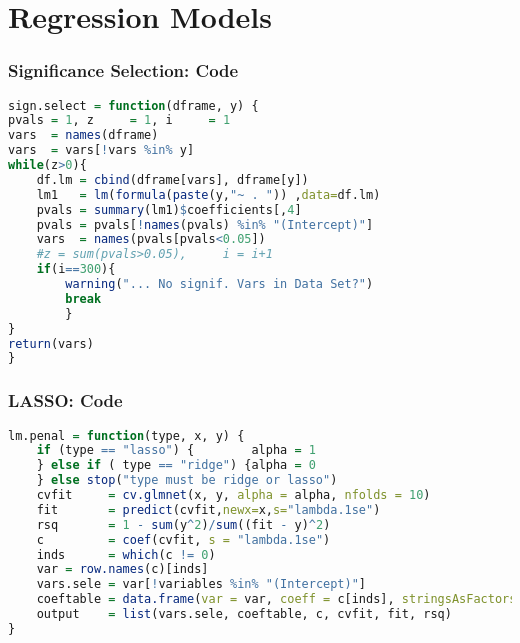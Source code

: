
\section{Regression Models}

\begin{frame}[fragile]
\frametitle{Significance Selection: Code}

\begin{lstlisting}[language=R]
sign.select = function(dframe, y) {
pvals = 1, z     = 1, i     = 1
vars  = names(dframe)
vars  = vars[!vars %in% y]
while(z>0){
    df.lm = cbind(dframe[vars], dframe[y])
    lm1   = lm(formula(paste(y,"~ . ")) ,data=df.lm)
    pvals = summary(lm1)$coefficients[,4]
    pvals = pvals[!names(pvals) %in% "(Intercept)"]
    vars  = names(pvals[pvals<0.05])
    #z = sum(pvals>0.05),     i = i+1
    if(i==300){
        warning("... No signif. Vars in Data Set?")
        break
        }
}
return(vars)
}

\end{lstlisting}

\end{frame}




\begin{frame}[fragile]
\frametitle{LASSO: Code}

\begin{lstlisting}[language=R]
lm.penal = function(type, x, y) {
    if (type == "lasso") {        alpha = 1
    } else if ( type == "ridge") {alpha = 0
    } else stop("type must be ridge or lasso")
    cvfit     = cv.glmnet(x, y, alpha = alpha, nfolds = 10)
    fit       = predict(cvfit,newx=x,s="lambda.1se")
    rsq       = 1 - sum(y^2)/sum((fit - y)^2)
    c         = coef(cvfit, s = "lambda.1se")
    inds      = which(c != 0)
    var = row.names(c)[inds]
    vars.sele = var[!variables %in% "(Intercept)"]
    coeftable = data.frame(var = var, coeff = c[inds], stringsAsFactors = F)
    output    = list(vars.sele, coeftable, c, cvfit, fit, rsq)
}

\end{lstlisting}

\end{frame}



